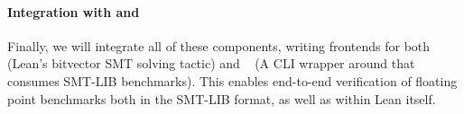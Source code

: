 \documentclass[onecolumn]{article}
\begin{document}
\paragraph{Integration with \bvdecide{} and \leanwuzla{}}
Finally, we will integrate all of these components,
writing frontends for both \bvdecide{} (Lean's bitvector SMT solving tactic) and
\leanwuzla{}~\cite{leanwuzla} (A CLI wrapper around \bvdecide{} that consumes SMT-LIB benchmarks).
This enables end-to-end verification of floating point benchmarks both in the SMT-LIB format, as well as within Lean itself.








\end{document}
